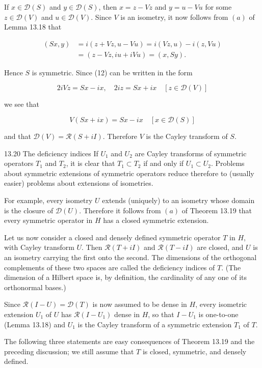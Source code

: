\documentclass[10pt]{article}
\begin{document}
If $x \in \mathscr{D}(S)$ and $y \in \mathscr{D}(S)$, then $x=z-V z$ and $y=u-V u$ for some $z \in \mathscr{D}(V)$ and $u \in \mathscr{D}(V)$. Since $V$ is an isometry, it now follows from $(a)$ of Lemma 13.18 that

$$
\begin{aligned}
(S x, y) & =i(z+V z, u-V u)=i(V z, u)-i(z, V u) \\
& =(z-V z, i u+i V u)=(x, S y) .
\end{aligned}
$$

Hence $S$ is symmetric. Since (12) can be written in the form

$$
2 i V z=S x-i x, \quad 2 i z=S x+i x \quad[z \in \mathscr{D}(V)]
$$

we see that

$$
V(S x+i x)=S x-i x \quad[x \in \mathscr{D}(S)]
$$

and that $\mathscr{D}(V)=\mathscr{R}(S+i I)$. Therefore $V$ is the Cayley transform of $S$.

13.20 The deficiency indices If $U_{1}$ and $U_{2}$ are Cayley transforms of symmetric operators $T_{1}$ and $T_{2}$, it is clear that $T_{1} \subset T_{2}$ if and only if $U_{1} \subset U_{2}$. Problems about symmetric extensions of symmetric operators reduce therefore to (usually easier) problems about extensions of isometries.

For example, every isometry $U$ extends (uniquely) to an isometry whose domain is the closure of $\mathscr{D}(U)$. Therefore it follows from $(a)$ of Theorem 13.19 that every symmetric operator in $H$ has a closed symmetric extension.

Let us now consider a closed and densely defined symmetric operator $T$ in $H$, with Cayley transform $U$. Then $\mathscr{R}(T+i I)$ and $\mathscr{R}(T-i I)$ are closed, and $U$ is an isometry carrying the first onto the second. The dimensions of the orthogonal complements of these two spaces are called the deficiency indices of $T$. (The dimension of a Hilbert space is, by definition, the cardinality of any one of its orthonormal bases.)

Since $\mathscr{R}(I-U)=\mathscr{D}(T)$ is now assumed to be dense in $H$, every isometric extension $U_{1}$ of $U$ has $\mathscr{R}\left(I-U_{1}\right)$ dense in $H$, so that $I-U_{1}$ is one-to-one (Lemma 13.18) and $U_{1}$ is the Cayley transform of a symmetric extension $T_{1}$ of $T$.

The following three statements are easy consequences of Theorem 13.19 and the preceding discussion; we still assume that $T$ is closed, symmetric, and densely defined.
\end{document}
